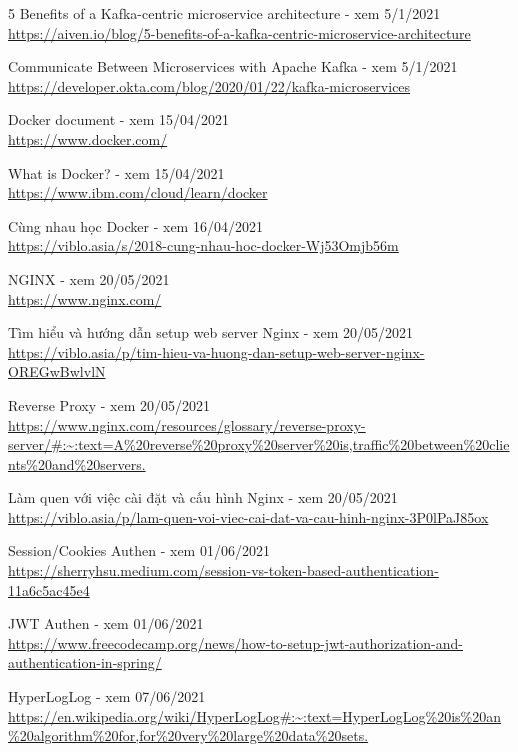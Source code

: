 \documentclass[12pt,a4paper,oneside]{book}
\begin{document}
\begin{thebibliography}{80}
        \bibitem{} 5 Benefits of a Kafka-centric microservice architecture - xem 5/1/2021\\
        \url{https://aiven.io/blog/5-benefits-of-a-kafka-centric-microservice-architecture}
        
        \bibitem{} Communicate Between Microservices with Apache Kafka - xem 5/1/2021\\
        \url{https://developer.okta.com/blog/2020/01/22/kafka-microservices}
        
        \bibitem{} Docker document - xem 15/04/2021\\
        \url{https://www.docker.com/}
        
        \bibitem{} What is Docker? - xem 15/04/2021\\
        \url{https://www.ibm.com/cloud/learn/docker}
        
         Cùng nhau học Docker - xem 16/04/2021\\
        \url{https://viblo.asia/s/2018-cung-nhau-hoc-docker-Wj53Omjb56m}
        
         NGINX - xem 20/05/2021\\
        \url{https://www.nginx.com/}
        
        \bibitem{} Tìm hiểu và hướng dẫn setup web server Nginx - xem 20/05/2021\\
        \url{https://viblo.asia/p/tim-hieu-va-huong-dan-setup-web-server-nginx-OREGwBwlvlN}
        
         Reverse Proxy - xem 20/05/2021\\
        \url{https://www.nginx.com/resources/glossary/reverse-proxy-server/#:~:text=A%20reverse%20proxy%20server%20is,traffic%20between%20clients%20and%20servers.}
        
        \bibitem{} Làm quen với việc cài đặt và cấu hình Nginx - xem 20/05/2021\\
        \url{https://viblo.asia/p/lam-quen-voi-viec-cai-dat-va-cau-hinh-nginx-3P0lPaJ85ox}
        
        
         Session/Cookies Authen - xem 01/06/2021\\
        \url{https://sherryhsu.medium.com/session-vs-token-based-authentication-11a6c5ac45e4}
        
         JWT Authen - xem 01/06/2021\\
        \url{https://www.freecodecamp.org/news/how-to-setup-jwt-authorization-and-authentication-in-spring/}
        
         HyperLogLog - xem 07/06/2021\\
        \url{ https://en.wikipedia.org/wiki/HyperLogLog#:~:text=HyperLogLog%20is%20an%20algorithm%20for,for%20very%20large%20data%20sets.}
        
        
       
        
        
        
        
        

    \end{thebibliography}
\end{document}
